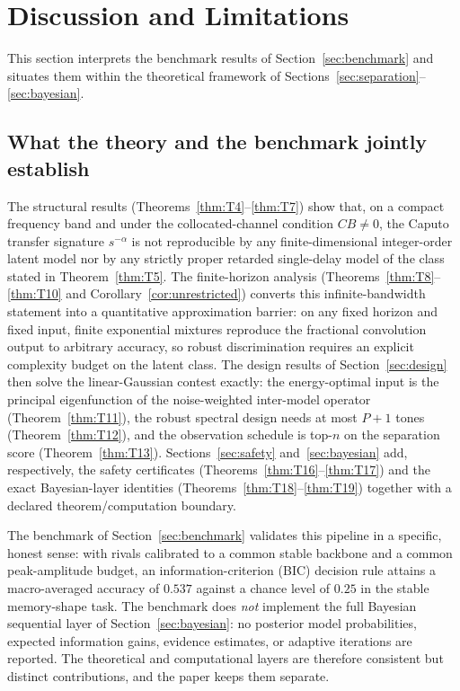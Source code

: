 \section{Discussion and Limitations}
\label{sec:discussion}

This section interprets the benchmark results of Section~\ref{sec:benchmark} and situates them within the theoretical framework of Sections~\ref{sec:separation}--\ref{sec:bayesian}.

\subsection{What the theory and the benchmark jointly establish}

The structural results (Theorems~\ref{thm:T4}--\ref{thm:T7}) show that, on a compact frequency band and under the collocated-channel condition $CB \neq 0$, the Caputo transfer signature $s^{-\alpha}$ is not reproducible by any finite-dimensional integer-order latent model nor by any strictly proper retarded single-delay model of the class stated in Theorem~\ref{thm:T5}. The finite-horizon analysis (Theorems~\ref{thm:T8}--\ref{thm:T10} and Corollary~\ref{cor:unrestricted}) converts this infinite-bandwidth statement into a quantitative approximation barrier: on any fixed horizon and fixed input, finite exponential mixtures reproduce the fractional convolution output to arbitrary accuracy, so robust discrimination requires an explicit complexity budget on the latent class. The design results of Section~\ref{sec:design} then solve the linear-Gaussian contest exactly: the energy-optimal input is the principal eigenfunction of the noise-weighted inter-model operator (Theorem~\ref{thm:T11}), the robust spectral design needs at most $P+1$ tones (Theorem~\ref{thm:T12}), and the observation schedule is top-$n$ on the separation score (Theorem~\ref{thm:T13}). Sections~\ref{sec:safety} and~\ref{sec:bayesian} add, respectively, the safety certificates (Theorems~\ref{thm:T16}--\ref{thm:T17}) and the exact Bayesian-layer identities (Theorems~\ref{thm:T18}--\ref{thm:T19}) together with a declared theorem/computation boundary.

The benchmark of Section~\ref{sec:benchmark} validates this pipeline in a specific, honest sense: with rivals calibrated to a common stable backbone and a common peak-amplitude budget, an information-criterion (BIC) decision rule attains a macro-averaged accuracy of $0.537$ against a chance level of $0.25$ in the stable memory-shape task. The benchmark does \emph{not} implement the full Bayesian sequential layer of Section~\ref{sec:bayesian}: no posterior model probabilities, expected information gains, evidence estimates, or adaptive iterations are reported. The theoretical and computational layers are therefore consistent but distinct contributions, and the paper keeps them separate.

